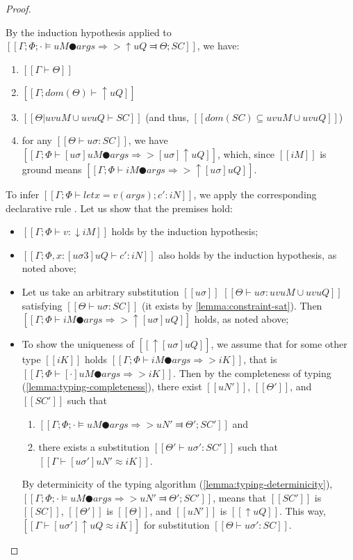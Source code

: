 \begin{proof}
\begin{caseof}
            By the induction hypothesis applied to 
            $[[Γ ; Φ ; · ⊨ uM ● args ⇒> ↑uQ ⫤ Θ; SC]]$, we have:
            \begin{enumerate}
                \item $[[Γ ⊢ Θ]]$
                \item $[[Γ; dom(Θ) ⊢  ↑uQ]]$
                \item $[[Θ|uv uM ∪ uv uQ ⊢ SC]]$ (and thus, $[[dom(SC) ⊆ uv uM ∪ uv uQ]]$)
                \item for any $[[ Θ ⊢ uσ : SC ]]$, we have $[[ Γ ; Φ ⊢ [uσ]uM ● args ⇒> [uσ]↑uQ ]]$, 
                    which, since  $[[iM]]$ is ground means $[[ Γ ; Φ ⊢ iM ● args ⇒> ↑[uσ]uQ]]$.
            \end{enumerate}


            To infer $[[Γ ; Φ ⊢ let x = v(args) ; c' : iN ]]$, 
            we apply the corresponding 
            declarative rule .
            Let us show that the premises hold:
            \begin{itemize}
                \item $[[Γ; Φ ⊢ v : ↓iM]]$ holds by the induction hypothesis;
                \item $[[Γ; Φ, x:[uσ3]uQ ⊢ c' : iN]]$ also holds by the induction hypothesis, as noted above;
                \item Let us take an arbitrary substitution $[[uσ]]$ 
                    $[[ Θ ⊢ uσ : uv uM ∪ uv uQ ]]$
                    satisfying $[[ Θ ⊢ uσ : SC ]]$
                    (it exists by \cref{lemma:constraint-sat}).
                    Then $[[Γ; Φ ⊢ iM ● args ⇒> ↑[uσ]uQ ]]$ holds, as noted above;
                \item To show the uniqueness of $[[↑[uσ]uQ]]$,
                    we assume that for some other type $[[iK]]$ 
                    holds $[[Γ; Φ ⊢ iM ● args ⇒> iK ]]$,
                    that is $[[Γ; Φ ⊢ [·]uM ● args ⇒> iK ]]$.
                    Then by the completeness of typing 
                    (\cref{lemma:typing-completeness}),
                    there exist $[[uN']]$, $[[Θ']]$, and $[[SC']]$ such that
                    \begin{enumerate}
                        \item $[[ Γ; Φ; · ⊨ uM ● args ⇒> uN' ⫤ Θ'; SC' ]]$ and
                        \item there exists a substitution $[[Θ' ⊢ uσ' : SC']]$ 
                            such that $[[Γ ⊢ [uσ']uN' ≈ iK]]$.
                    \end{enumerate}
                    By determinicity of the typing algorithm (\cref{lemma:typing-determinicity}),
                    $[[ Γ; Φ; · ⊨ uM ● args ⇒> uN' ⫤ Θ'; SC' ]]$,
                    means that $[[SC']]$ is $[[SC]]$, $[[Θ']]$ is $[[Θ]]$, and $[[uN']]$ is
                    $[[↑uQ]]$. 
                    This way, $[[Γ ⊢ [uσ']↑uQ ≈ iK]]$ for substitution 
                    $[[Θ ⊢ uσ' : SC]]$. 


\end{itemize}
\end{caseof}
\end{proof}
